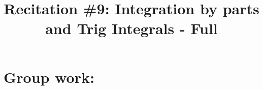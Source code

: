 \documentclass[]{ximera}
\title{Recitation \#9: Integration by parts and Trig Integrals - Full}
\begin{document}
\begin{abstract}		\end{abstract}
\maketitle



\begin{comment}
\section{Warm up:}

	\begin{freeResponse}
	
	\end{freeResponse}
	
\begin{instructorNotes}

\end{instructorNotes}
\end{comment}







\section{Group work:}
\end{document}
